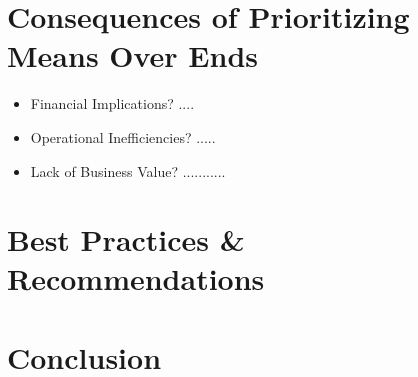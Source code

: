 \documentclass[a4Paper]{article}
\begin{document}
\section{Consequences of Prioritizing Means Over Ends}
\begin{itemize}
    \item Financial Implications?
    ....
    \item  Operational Inefficiencies?
    .....
    \item Lack of Business Value?
    ...........
\end{itemize}

\section{Best Practices \& Recommendations}
\section{Conclusion}
\pagebreak


\end{document}
